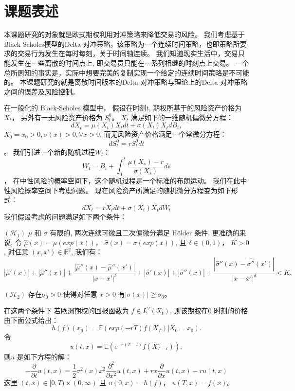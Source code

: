 
\section{课题表述} %
\label{sec:subject}

本课题研究的对象就是欧式期权利用对冲策略来降低交易的风险。
我们考虑基于Black-Scholes模型的Delta 对冲策略，该策略为一个连续时间策略，也即策略所要求的交易行为发生在每时每刻，关于时间轴连续。
我们知道现实生活中，交易只能发生在一些离散的时间点上, 即交易员只能在一系列相继的时刻点上交易。
一个总所周知的事实是，实际中想要完美的复制实现一个给定的连续时间策略是不可能的。
本课题研究的就是离散时间版本的Delta 对冲策略与理论上的Delta 对冲策略之间的误差及风险控制。

在一般化的 Black-Scholes 模型中， 假设在时刻$t$, 期权所基于的风险资产价格为 $X_t$， 另外有一无风险资产价格为 $S_t^0$。
$X_t$ 满足如下的一维随机偏微分方程：
\begin{equation}
dX_t=\mu(X_t)X_tdt+\sigma(X_t)X_tdB_t,
\end{equation}
$X_0=x_0>0, \sigma(x)>0, \forall x>0$,
而无风险资产价格满足一个常微分方程：
\begin{equation}
dS_t^0=rS^0_tdt
\end{equation}。
我们引进一个新的随机过程$W_t$：
\begin{equation}
W_t=B_t+\int^t_0\frac{\mu(X_s)-r}{\sigma(X_s)}ds
\end{equation}，
在中性风险的概率空间下，这个随机过程是一个标准的布朗运动。 我们在此中性风险概率空间下考虑问题。
现在风险资产所满足的随机微分方程变为如下形式：
\begin{equation}
dX_t=rX_tdt+\sigma(X_t)X_tdW_t
\end{equation}
我们假设考虑的问题满足如下两个条件：

$(\mathcal{H}_1)$ $\mu$ 和 $\sigma$ 有限的, 两次连续可微且二次偏微分满足 H\"{o}lder 条件. 更准确的来说, 令 $\hat{\mu}(x)=\mu(exp(x))$， $\hat{\sigma}(x)=\sigma(exp(x))$, 且 $\delta\in (0,1)$， $K>0$, 对任意 $(x,x')\in \mathbb{R}^2$, 我们有：
$$|\hat{\mu}'(x)|+|\hat{\mu}''(x)|+\frac{|\hat{\mu}''(x)-\hat{\mu}''(x')|}{|x-x'|^\delta}+|\hat{\sigma}'(x)|+|\hat{\sigma}''(x)|+\frac{|\hat{\sigma}''(x)-\hat{\sigma''}(x')|}{|x-x'|^\delta}<K.$$ 

$(\mathcal{H}_2)$ 存在$\sigma_0>0$ 使得对任意 $x>0$ 有$|\sigma(x)|\geq \sigma_0$。

在这两个条件下
若欧洲期权的回报函数为 $f\in L^2(X_t)$, 则该期权在0 时刻的价格由下面公式给出：
\begin{equation}
h(f)(x_0)=\mathbb{E}(exp(-rT)f(X_T)|X_0=x_0).
\end{equation}
令
\begin{equation}
u(t, x)=\mathbb{E}(e^{-r(T-t)}f(X_{T-t}^x)),
\end{equation}
则$u$ 是如下方程的解：
\begin{equation}
-\frac{\partial}{\partial t}u(t, x) =\frac{1}{2}\sigma^2(x)x^2\frac{\partial^2}{\partial x^2}u(t,x)+rx\frac{\partial}{\partial x}u(t,x)-ru(t,x)
\end{equation}
这里 $(t,x)\in [0,T)\times (0,\infty)$ 且 $u(0,x)=h(f)$，  $u(T,x)=f(x)$。

